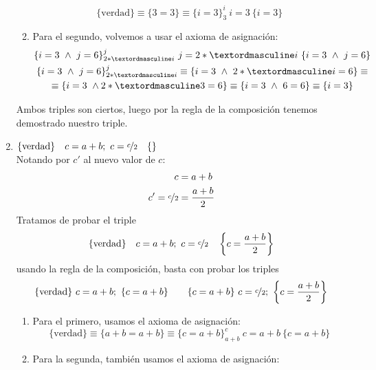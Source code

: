 \begin{ejercicio}
\begin{enumerate}
\begin{enumerate}
                    \begin{equation*}
                        \{\text{verdad}\} \equiv \{3=3\} \equiv \{i=3\}^i_3\ i=3\ \{i=3\}
                    \end{equation*}
                \item Para el segundo, volvemos a usar el axioma de asignación:
                    \begin{gather*}
                        \{i=3\ \land\ j=6\}^j_{2\astºi}\ j=2\astº i\ \{i=3\ \land\ j=6\}\\
                        \{i=3\ \land\ j=6\}^j_{2\astºi} \equiv \{i=3\ \land\ 2\astº i=6\} \equiv\\ 
                        \equiv \{i=3\ \land 2\astº 3=6\} \equiv \{i=3\ \land\ 6=6\} \equiv \{i=3\}
                    \end{gather*}
            \end{enumerate}
            Ambos triples son ciertos, luego por la regla de la composición tenemos demostrado nuestro triple.
        \item $\{\text{verdad}\} \quad c = a + b;~c = \nicefrac{c}{2} \quad \{ \}$\\
            Notando por $c'$ al nuevo valor de $c$:
            \begin{align*}
                c &= a + b \\
                c' = \nicefrac{c}{2} &= \frac{a+b}{2}
            \end{align*}
            Tratamos de probar el triple
            \begin{equation*}
                \{\text{verdad}\} \quad c = a + b;~c = \nicefrac{c}{2} \quad \left\{c=\frac{a+b}{2}\right\}
            \end{equation*}
            usando la regla de la composición, basta con probar los triples
            \begin{equation*}
                \{\text{verdad}\}\ c=a+b;\ \{c=a+b\} \qquad \{c=a+b\}\ c=\nicefrac{c}{2};\ \left\{c=\frac{a+b}{2}\right\}
            \end{equation*}
            \begin{enumerate}
                \item Para el primero, usamos el axioma de asignación:
                    \begin{equation*}
                        \{\text{verdad}\}\equiv\{a+b=a+b\}\equiv \{c=a+b\}^c_{a+b}\ c=a+b\ \{c=a+b\}
                    \end{equation*}
                \item Para la segunda, también usamos el axioma de asignación:

\end{enumerate}
\end{enumerate}
\end{ejercicio}
